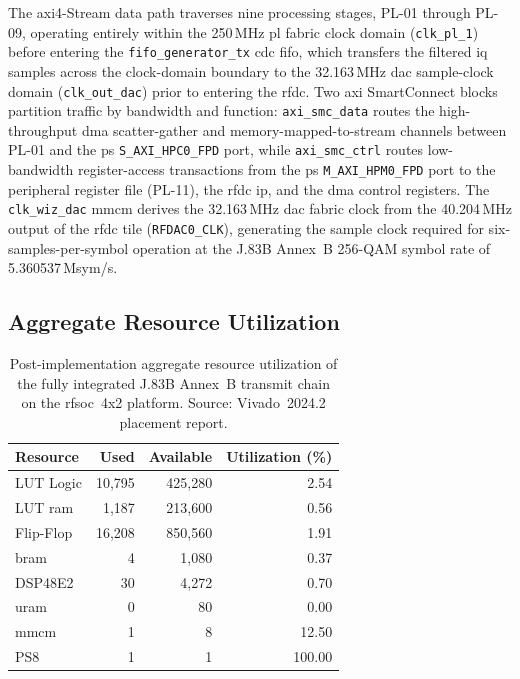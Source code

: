 The \ac{axi}4-Stream data path traverses nine processing stages, PL-01
through PL-09, operating entirely within the 250\,MHz \ac{pl} fabric
clock domain (\texttt{clk\_pl\_1}) before entering the
\texttt{fifo\_generator\_tx} \ac{cdc} \ac{fifo}, which transfers the
filtered \ac{iq} samples across the clock-domain boundary to the
32.163\,MHz \ac{dac} sample-clock domain (\texttt{clk\_out\_dac})
prior to entering the \ac{rfdc}.
Two \ac{axi} SmartConnect blocks partition traffic by bandwidth and
function: \texttt{axi\_smc\_data} routes the high-throughput \ac{dma}
scatter-gather and memory-mapped-to-stream channels between PL-01 and
the \ac{ps} \texttt{S\_AXI\_HPC0\_FPD} port, while
\texttt{axi\_smc\_ctrl} routes low-bandwidth register-access
transactions from the \ac{ps} \texttt{M\_AXI\_HPM0\_FPD} port to the
peripheral register file (PL-11), the \ac{rfdc} \ac{ip}, and the
\ac{dma} control registers.
The \texttt{clk\_wiz\_dac} \ac{mmcm} derives the 32.163\,MHz \ac{dac}
fabric clock from the 40.204\,MHz output of the \ac{rfdc} tile
(\texttt{RFDAC0\_CLK}), generating the sample clock required for
six-samples-per-symbol operation at the J.83B Annex~B 256-QAM symbol
rate of 5.360537\,Msym/s.

\subsection{Aggregate Resource Utilization}
\label{subsec:aggregate_util}

\begin{table}[htbp]
  \caption{Post-implementation aggregate resource utilization of the
           fully integrated J.83B Annex~B transmit chain on the
           \ac{rfsoc}~4x2 platform.
           Source: Vivado~2024.2 placement report.}
  \label{tab:tx_chain_util}
  \centering
  \begin{tabular}{lrrr}
    \hline
    Resource      & Used   & Available & Utilization (\%) \\
    \hline
    LUT Logic     & 10,795 &   425,280 & 2.54  \\
    LUT \ac{ram}  &  1,187 &   213,600 & 0.56  \\
    Flip-Flop     & 16,208 &   850,560 & 1.91  \\
    \ac{bram}     &      4 &     1,080 & 0.37  \\
    DSP48E2       &     30 &     4,272 & 0.70  \\
    \ac{uram}     &      0 &        80 & 0.00  \\
    \ac{mmcm}     &      1 &         8 & 12.50 \\
    PS8           &      1 &         1 & 100.00 \\
    \hline
  \end{tabular}
\end{table}

